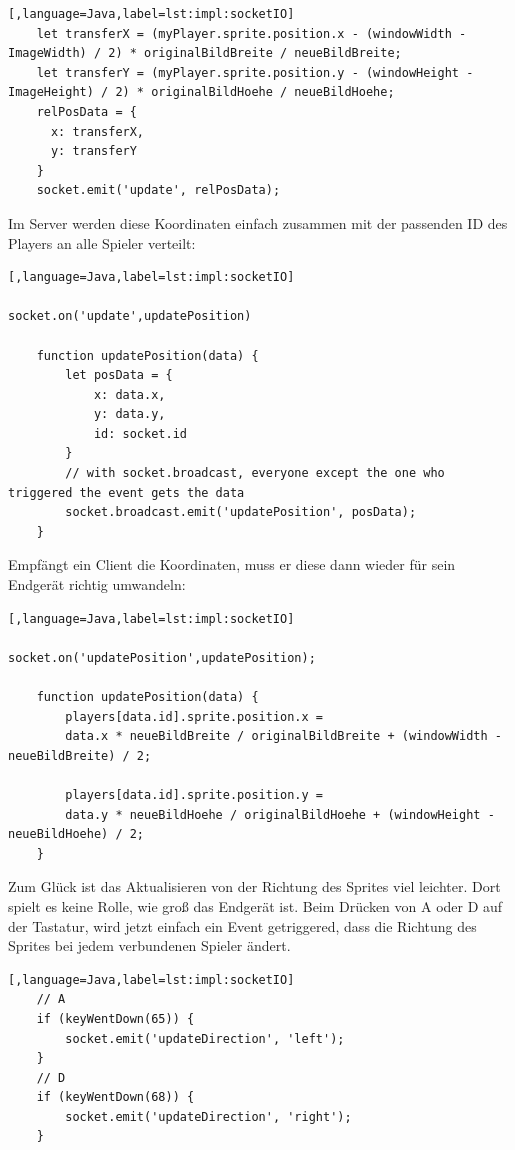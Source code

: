 \begin{lstlisting}[,language=Java,label=lst:impl:socketIO]
    let transferX = (myPlayer.sprite.position.x - (windowWidth - ImageWidth) / 2) * originalBildBreite / neueBildBreite;
    let transferY = (myPlayer.sprite.position.y - (windowHeight - ImageHeight) / 2) * originalBildHoehe / neueBildHoehe;
    relPosData = {
      x: transferX,
      y: transferY
    }
    socket.emit('update', relPosData);
\end{lstlisting}

Im Server werden diese Koordinaten einfach zusammen mit der passenden ID des Players an alle Spieler verteilt:

\begin{lstlisting}[,language=Java,label=lst:impl:socketIO]

socket.on('update',updatePosition)

    function updatePosition(data) {
        let posData = {
            x: data.x,
            y: data.y,
            id: socket.id
        }
        // with socket.broadcast, everyone except the one who triggered the event gets the data
        socket.broadcast.emit('updatePosition', posData);
    }
\end{lstlisting}

Empfängt ein Client die Koordinaten, muss er diese dann wieder für sein Endgerät richtig umwandeln: 


\begin{lstlisting}[,language=Java,label=lst:impl:socketIO]

socket.on('updatePosition',updatePosition);

    function updatePosition(data) {
        players[data.id].sprite.position.x = 
        data.x * neueBildBreite / originalBildBreite + (windowWidth - neueBildBreite) / 2;

        players[data.id].sprite.position.y = 
        data.y * neueBildHoehe / originalBildHoehe + (windowHeight - neueBildHoehe) / 2;
    }
\end{lstlisting}

Zum Glück ist das Aktualisieren von der Richtung des Sprites viel leichter. Dort spielt es keine Rolle, wie groß das Endgerät ist. 
Beim Drücken von A oder D auf der Tastatur, wird jetzt einfach ein Event getriggered, dass die Richtung des Sprites bei jedem verbundenen Spieler ändert.


\begin{lstlisting}[,language=Java,label=lst:impl:socketIO]
    // A
    if (keyWentDown(65)) {
        socket.emit('updateDirection', 'left');
    }
    // D
    if (keyWentDown(68)) {
        socket.emit('updateDirection', 'right');
    }
\end{lstlisting}

